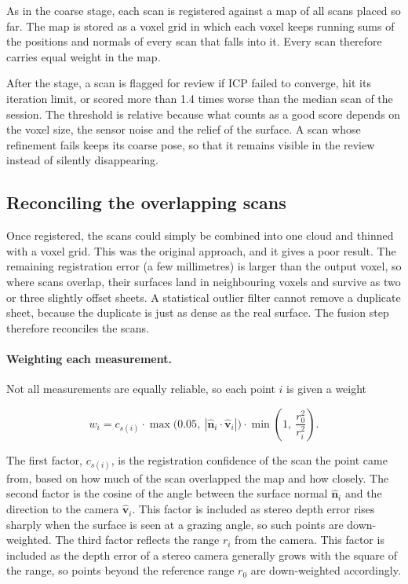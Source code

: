 As in the coarse stage, each scan is registered against a map of all scans placed so far. The map is stored as a voxel grid in which each voxel keeps running sums of the positions and normals of every scan that falls into it. Every scan therefore carries equal weight in the map. 

After the stage, a scan is flagged for review if ICP failed to converge, hit its iteration limit, or scored more than 1.4 times worse than the median scan of the session. The threshold is relative because what counts as a good score depends on the voxel size, the sensor noise and the relief of the surface. A scan whose refinement fails keeps its coarse pose, so that it remains visible in the review instead of silently disappearing.

\subsection{Reconciling the overlapping scans}
\label{sec:4-Reconciling-Overlapping-Scans}

Once registered, the scans could simply be combined into one cloud and thinned with a voxel grid. This was the original approach, and it gives a poor result. The remaining registration error (a few millimetres) is larger than the output voxel, so where scans overlap, their surfaces land in neighbouring voxels and survive as two or three slightly offset sheets. A statistical outlier filter cannot remove a duplicate sheet, because the duplicate is just as dense as the real surface. The fusion step therefore reconciles the scans. 

\paragraph{Weighting each measurement.} Not all measurements are equally reliable, so each point $i$ is given a weight

\begin{equation}
	w_i = c_{s(i)} \cdot \max\!\big(0.05,\ |\hat{\mathbf{n}}_i \cdot
	\hat{\mathbf{v}}_i|\big) \cdot \min\!\left(1,\ \frac{r_0^2}{r_i^2}\right).
\end{equation}

The first factor, $c_{s(i)}$, is the registration confidence of the scan the point came from, based on how much of the scan overlapped the map and how closely. The second factor is the cosine of the angle between the surface normal $\hat{\mathbf{n}}_i$ and the direction to the camera $\hat{\mathbf{v}}_i$. This factor is included as stereo depth error rises sharply when the surface is seen at a grazing angle, so such points are down-weighted. The third factor reflects the range $r_i$ from the camera. This factor is included as the depth error of a stereo camera generally grows with the square of the range, so points beyond the reference range $r_0$ are down-weighted accordingly.

